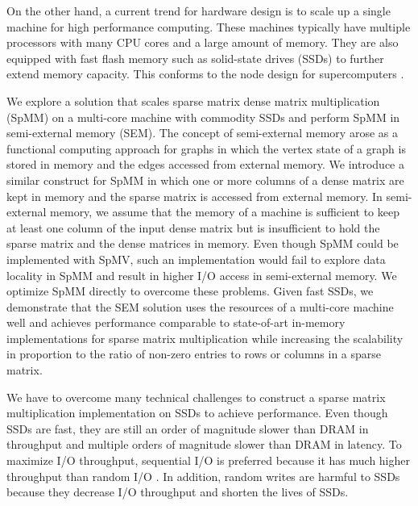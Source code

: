 
On the other hand, a current trend for hardware design is to scale up
a single machine for high performance computing.
These machines typically have multiple processors with many CPU cores and
a large amount of memory. They are also equipped with fast flash
memory such as solid-state drives (SSDs) to further extend memory capacity.
This conforms to the node design for supercomputers \cite{Ang14}.

We explore a solution that scales sparse matrix dense matrix multiplication
(SpMM) on a multi-core machine with commodity SSDs and
perform SpMM in semi-external memory (SEM). The concept of semi-external memory
arose as a functional computing approach for graphs \cite{Abello98} in which
the vertex state of a graph is stored in memory and the edges accessed from
external memory. We introduce a similar construct for SpMM in which one or more
columns of a dense matrix are kept in memory and the sparse matrix is accessed
from external memory. In semi-external memory, we assume
that the memory of a machine is sufficient to keep at least one column
of the input dense matrix but is insufficient to hold the sparse matrix
and the dense matrices in memory. Even though SpMM could be implemented with
SpMV, such an implementation would fail to explore data locality in SpMM and
result in higher I/O access in semi-external memory. We optimize SpMM directly
to overcome these problems. Given fast SSDs, we demonstrate that the SEM
solution uses the resources of a multi-core machine well and
achieves performance comparable to state-of-art in-memory implementations
for sparse matrix multiplication while increasing the scalability in proportion
to the ratio of non-zero entries to rows or columns in a sparse matrix.


We have to overcome many technical challenges to construct a sparse matrix
multiplication implementation on SSDs to achieve performance. Even though SSDs
are fast, they are still an order of magnitude slower than DRAM in throughput
and multiple orders of magnitude slower than DRAM in latency.
To maximize I/O throughput, sequential I/O is preferred because it has much
higher throughput than random I/O \cite{safs}. In addition, random writes are
harmful to SSDs \cite{sfs} because
they decrease I/O throughput and shorten the lives of SSDs.


